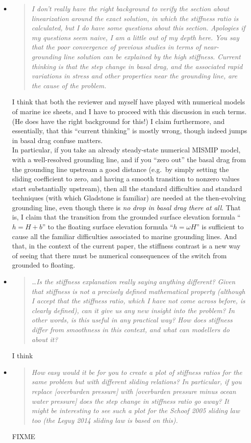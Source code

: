 \documentclass[11pt,reqno]{amsart}
\newcommand{\reply}[2]{
\medskip\medskip
\item  \begin{quote}
\emph{#1}
\end{quote}

\medskip
\noindent #2}
\begin{document}
\begin{itemize}
\reply{I don't really have the right background to verify the section about linearization around the exact solution, in which the stiffness ratio is calculated, but I do have some questions about this section. Apologies if my questions seem naive, I am a little out of my depth here. You say that the poor convergence of previous studies in terms of near-grounding line solution can be explained by the high stiffness. Current thinking is that the step change in basal drag, and the associated rapid variations in stress and other properties near the grounding line, are the cause of the problem.}
{I think that both the reviewer and myself have played with numerical models of marine ice sheets, and I have to proceed with this discussion in such terms.  (He does have the right background for this!)  I claim furthermore, and essentially, that this ``current thinking'' is mostly wrong, though indeed jumps in basal drag confuse matters.\medskip \\
In particular, if you take an already steady-state numerical MISMIP model, with a well-resolved grounding line, and if you ``zero out'' the basal drag from the grounding line upstream a good distance (e.g.~by simply setting the sliding coefficient to zero, and having a smooth transition to nonzero values start substantially upstream), then all the standard difficulties and standard techniques (with which Gladstone is familiar) are needed at the then-evolving grounding line, even though there is \emph{no drop in basal drag there at all}.  That is, I claim that the transition from the grounded surface elevation formula ``$h=H+b$'' to the floating surface elevation formula ``$h=\omega H$'' is sufficient to cause all the familiar difficulties associated to marine grounding lines.  And that, in the context of the current paper, the stiffness contrast is a new way of seeing that there must be numerical consequences of the switch from grounded to floating.}

\reply{\dots Is the stiffness explanation really saying anything different? Given that stiffness is not a precisely defined mathematical property (although I accept that the stiffness ratio, which I have not come across before, is clearly defined), can it give us any new insight into the problem? In other words, is this useful in any practical way? How does stiffness differ from smoothness in this context, and what can modellers do about it?}
{I think}

\reply{How easy would it be for you to create a plot of stiffness ratios for the same problem but with different sliding relations? In particular, if you replace [overburden pressure] with [overburden pressure minus ocean water pressure] does the step change in stiffness ratio go away? It might be interesting to see such a plot for the Schoof 2005 sliding law too (the Leguy 2014 sliding law is based on this).}
{FIXME}


\end{itemize}
\end{document}
